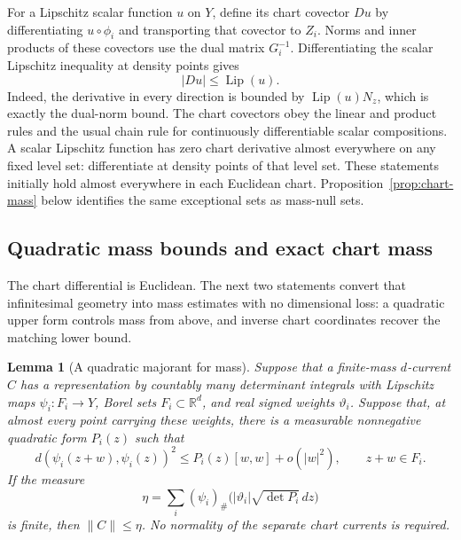 \documentclass[11pt]{article}
\numberwithin{equation}{section}
\newtheorem{lemma}[theorem]{Lemma}
\theoremstyle{definition}
\theoremstyle{remark}
\begin{document}
For a Lipschitz scalar function \(u\) on \(Y\), define its chart covector
\(Du\) by differentiating \(u\circ\phi_i\) and transporting that covector
to \(Z_i\). Norms and inner products of these covectors use the dual
matrix \(G_i^{-1}\). Differentiating the scalar Lipschitz inequality at
density points gives
\begin{equation}
\label{eq:gradient-lipschitz}
 |Du|\le\operatorname{Lip}(u).
\end{equation}
Indeed, the derivative in every direction is bounded by
\(\operatorname{Lip}(u)N_z\), which is exactly the dual-norm bound. The chart covectors
obey the linear and product rules and the usual chain rule for continuously
differentiable scalar compositions. A scalar Lipschitz function has zero
chart derivative almost everywhere on any fixed level set: differentiate
at density points of that level set. These statements initially hold
almost everywhere in each Euclidean chart. Proposition~\ref{prop:chart-mass}
below identifies the same exceptional sets as mass-null sets.

\subsection{Quadratic mass bounds and exact chart mass}

The chart differential is Euclidean. The next two statements convert
that infinitesimal geometry into mass estimates with no dimensional
loss: a quadratic upper form controls mass from above, and inverse
chart coordinates recover the matching lower bound.

\begin{lemma}[A quadratic majorant for mass]
\label{lem:quadratic-mass}
Suppose that a finite-mass \(d\)-current \(C\) has a representation by
countably many determinant integrals with Lipschitz maps
\(\psi_i:F_i\to Y\), Borel sets \(F_i\subset\mathbb R^d\), and real signed
weights \(\vartheta_i\). Suppose that, at almost every point carrying
these weights, there is a measurable nonnegative quadratic form
\(P_i(z)\) such that
\begin{equation}
\label{eq:quadratic-distance-majorant}
 d(\psi_i(z+w),\psi_i(z))^2
 \le P_i(z)[w,w]+o(|w|^2),\qquad z+w\in F_i.
\end{equation}
If the measure
\begin{equation}
\label{eq:quadratic-mass-majorant}
 \eta=\sum_i(\psi_i)_\#
       \bigl(|\vartheta_i|\sqrt{\det P_i}\,d z\bigr)
\end{equation}
is finite, then \(\|C\|\le\eta\). No normality of the separate chart
currents is required.
\end{lemma}
\end{document}

